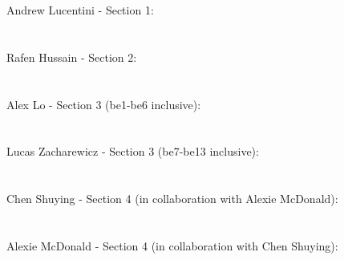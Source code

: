 \documentclass[12pt, titlepage]{article}
\begin{document}
Andrew Lucentini  - Section 1: \\\\\\
Rafen Hussain     - Section 2: \\\\\\
Alex Lo           - Section 3 (be1-be6 inclusive): \\\\\\
Lucas Zacharewicz - Section 3 (be7-be13 inclusive): \\\\\\
Chen Shuying      - Section 4 (in collaboration with Alexie McDonald): \\\\\\
Alexie McDonald   - Section 4 (in collaboration with Chen Shuying): \\\\\\
\end{document}
